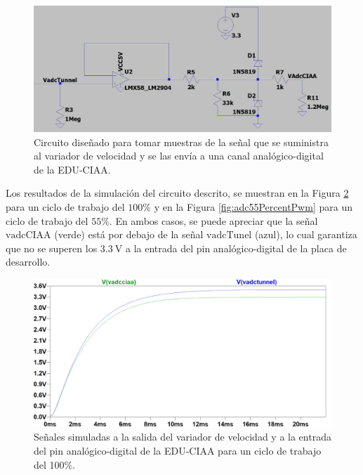 \begin{figure}[H]
    \centering
    \includegraphics[width=1\linewidth]{Figuras/datalogger/Hardware/adcCiaaCircuitSimulate.png}
    \caption{Circuito diseñado para tomar muestras de la señal que se suministra al variador de velocidad y se las envía a una canal analógico-digital de la EDU-CIAA.}
    \label{fig:adcCiaaCircuitSimulate}
\end{figure}
Los resultados de la simulación del circuito descrito, se muestran en la Figura \ref{fig:adc100PercentPwm} para un ciclo de trabajo del $100\%$ y en la Figura \ref{fig:adc55PercentPwm} para un ciclo de trabajo del $55\%$. En ambos casos, se puede apreciar que la señal $\text{vadcCIAA}$ (verde) está por debajo de la señal $\text{vadcTunel}$ (azul), lo cual garantiza que no se superen los $\SI{3.3}{\volt}$ a la entrada del pin analógico-digital de la placa de desarrollo.


\begin{figure}[H]
    \centering
    \includegraphics[width=1\linewidth]{Figuras/datalogger/Hardware/adc100PercentPwm.png}
    \caption{Señales simuladas a la salida del variador de velocidad y a la entrada del pin analógico-digital de la EDU-CIAA para un ciclo de trabajo del 100\%.}
    \label{fig:adc100PercentPwm}
\end{figure}


